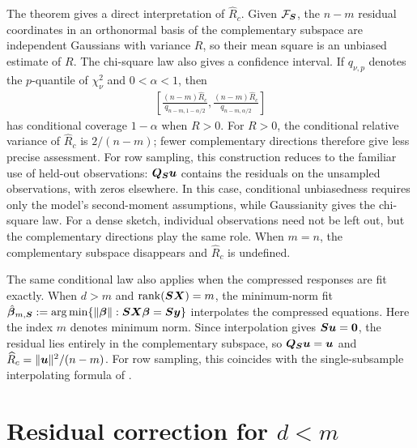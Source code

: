 \documentclass{article}
\theoremstyle{plain} %
\theoremstyle{definition} %
\theoremstyle{definition} %
\begin{document}
The theorem gives a direct interpretation of $\widehat R_c$. Given ${\mathcal F}_{\boldsymbol{S}}$, the $n-m$ residual coordinates in an orthonormal basis of the complementary subspace are independent Gaussians with variance $R$, so their mean square is an unbiased estimate of $R$. The chi-square law also gives a confidence interval. If $q_{\nu,p}$ denotes the $p$-quantile of $\chi^2_\nu$ and $0<\alpha<1$, then
\begin{align}
 \left[
 \frac{(n-m)\widehat R_c}{q_{n-m,1-\alpha/2}},
 \frac{(n-m)\widehat R_c}{q_{n-m,\alpha/2}}
 \right]
 \label{eq:cpal-risk-interval}
\end{align}
has conditional coverage $1-\alpha$ when $R>0$. For $R>0$, the conditional relative variance of $\widehat R_c$ is $2/(n-m)$; fewer complementary directions therefore give less precise assessment. For row sampling, this construction reduces to the familiar use of held-out observations: $\boldsymbol{Q}_{\boldsymbol{S}}\boldsymbol{u}$ contains the residuals on the unsampled observations, with zeros elsewhere. In this case, conditional unbiasedness requires only the model's second-moment assumptions, while Gaussianity gives the chi-square law. For a dense sketch, individual observations need not be left out, but the complementary directions play the same role. When $m=n$, the complementary subspace disappears and $\widehat R_c$ is undefined.

The same conditional law also applies when the compressed responses are fit exactly. When $d>m$ and $\operatorname{rank}(\boldsymbol{S}\boldsymbol{X})=m$, the minimum-norm fit
$\hat{\boldsymbol{\beta}}{}_{m,\boldsymbol{S}}:=\mathop{\rm arg\, min}\{\lVert\boldsymbol{\beta}\rVert:\boldsymbol{S}\boldsymbol{X}\boldsymbol{\beta}=\boldsymbol{S}\boldsymbol{y}\}$
interpolates the compressed equations. Here the index $m$ denotes minimum norm. Since interpolation gives
$\boldsymbol{S}\boldsymbol{u}=\mathbf{0}$, the residual lies entirely in the complementary subspace, so $\boldsymbol{Q}_{\boldsymbol{S}}\boldsymbol{u}=\boldsymbol{u}$ and
$\widehat R_c=\lVert\boldsymbol{u}\rVert^2/(n-m)$.
For row sampling, this coincides with the single-subsample interpolating formula of \citet{bellec2025corrected}.



\section{Residual correction for \texorpdfstring{$d<m$}{d < m}}
\label{sec:underparameterized-transfer}
\end{document}

